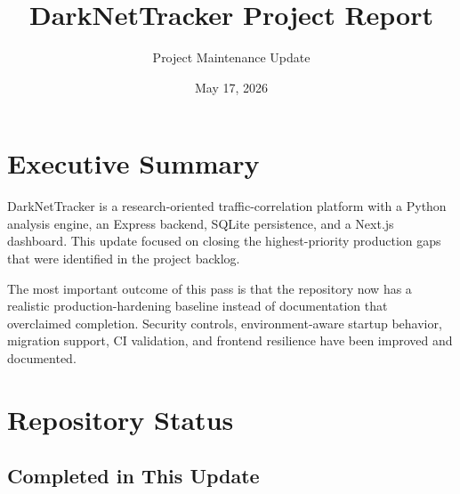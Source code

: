 \documentclass[12pt,a4paper]{report}
\title{DarkNetTracker Project Report}
\author{Project Maintenance Update}
\date{May 17, 2026}
\begin{document}
\maketitle
\tableofcontents
\newpage

\chapter{Executive Summary}

DarkNetTracker is a research-oriented traffic-correlation platform with a Python analysis engine, an Express backend, SQLite persistence, and a Next.js dashboard. This update focused on closing the highest-priority production gaps that were identified in the project backlog.

The most important outcome of this pass is that the repository now has a realistic production-hardening baseline instead of documentation that overclaimed completion. Security controls, environment-aware startup behavior, migration support, CI validation, and frontend resilience have been improved and documented.

\chapter{Repository Status}

\section{Completed in This Update}
\end{document}
